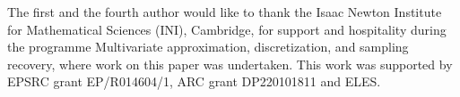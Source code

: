 \documentclass[12pt]{article}
\newcommand{\red}[1]{\textcolor{red}{#1}}
\begin{document}




The first and the fourth author would like to thank the Isaac Newton Institute for Mathematical Sciences (INI), Cambridge, for support and hospitality during the programme Multivariate approximation, discretization, and sampling recovery, where work on this paper was undertaken. This work was supported by EPSRC grant EP/R014604/1, ARC grant DP220101811 and ELES. %
\end{document}
